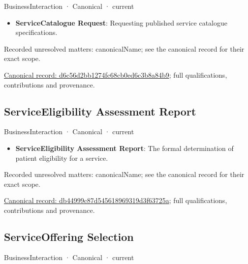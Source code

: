 \label{element:d6c56d2bb1274fc68cb0ed6c3b8a84b9}
{\small BusinessInteraction · Canonical · current}\par

\begin{itemize}


\item \textbf{ServiceCatalogue Request}: Requesting published service catalogue specifications.

\end{itemize}

{\small Recorded unresolved matters: canonicalName; see the canonical record for their exact scope.}\par
{\footnotesize \href{../../../../continuum/business/business-interaction/d6c56d2bb1274fc68cb0ed6c3b8a84b9.md}{Canonical record: d6c56d2bb1274fc68cb0ed6c3b8a84b9}; full qualifications, contributions and provenance.}\par
\subsection{ServiceEligibility Assessment Report}

\label{element:db44999c87d545618969319d3f63725a}
{\small BusinessInteraction · Canonical · current}\par

\begin{itemize}


\item \textbf{ServiceEligibility Assessment Report}: The formal determination of patient eligibility for a service.

\end{itemize}

{\small Recorded unresolved matters: canonicalName; see the canonical record for their exact scope.}\par
{\footnotesize \href{../../../../continuum/business/business-interaction/db44999c87d545618969319d3f63725a.md}{Canonical record: db44999c87d545618969319d3f63725a}; full qualifications, contributions and provenance.}\par
\subsection{ServiceOffering Selection}

\label{element:dbb4668e39994da6bd7ec0251210d4bc}
{\small BusinessInteraction · Canonical · current}\par

